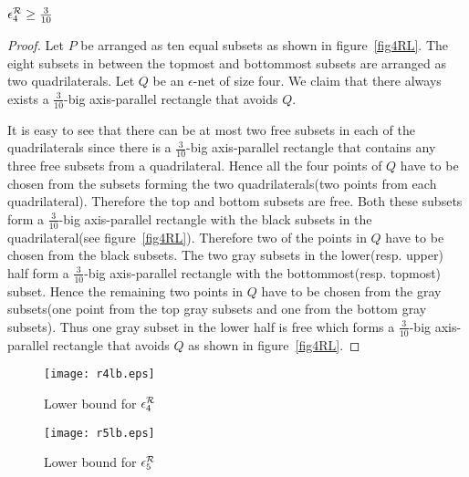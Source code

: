 \begin{lem}\label{lemma4RL}
 $\epsilon^{\cal{R}}_4 \geq \frac{3}{10}$
\end{lem}

\begin{proof}
Let $P$ be arranged as ten equal subsets as shown in figure~\ref{fig4RL}. The eight
subsets in between the topmost and bottommost subsets are arranged as two
quadrilaterals. Let $Q$ be an $\epsilon$-net of size four. We
claim that there always exists a $\frac{3}{10}$-big
axis-parallel rectangle that avoids $Q$. 

It is easy to see that there can be at most two free subsets in each of the
quadrilaterals since there is a $\frac{3}{10}$-big axis-parallel rectangle that contains
any three free subsets from a quadrilateral. Hence all the four points of $Q$ have to be chosen from the  subsets forming the two quadrilaterals(two points from each quadrilateral). Therefore the top and bottom
subsets are free. Both these subsets form a $\frac{3}{10}$-big axis-parallel
rectangle with the black subsets in the quadrilateral(see figure~\ref{fig4RL}). Therefore two of the points in $Q$ have to be chosen from the black subsets. The
two gray subsets in the lower(resp. upper) half form a $\frac{3}{10}$-big axis-parallel
rectangle with the bottommost(resp. topmost) subset. Hence the remaining two points in $Q$ have to be chosen from the gray subsets(one point from the top gray subsets and one from the bottom gray subsets). Thus one gray subset in the
lower half is free which forms a $\frac{3}{10}$-big axis-parallel rectangle that avoids $Q$ as shown
in figure~\ref{fig4RL}.

\end{proof}
\begin{figure}
\begin{minipage}[b]{160pt}


\begin{center}
\texttt{[image: r4lb.eps]}
\caption{Lower bound for $\epsilon^{\cal R}_4$}
\label{fig4RL}
\end{center}

\end{minipage}
\begin{minipage}[b]{200pt}
 \begin{center}
 \texttt{[image: r5lb.eps]}
\caption{Lower bound for $\epsilon^{\cal R}_5$}
\label{fig5lb}
\end{center}
\end{minipage}

\end{figure}

